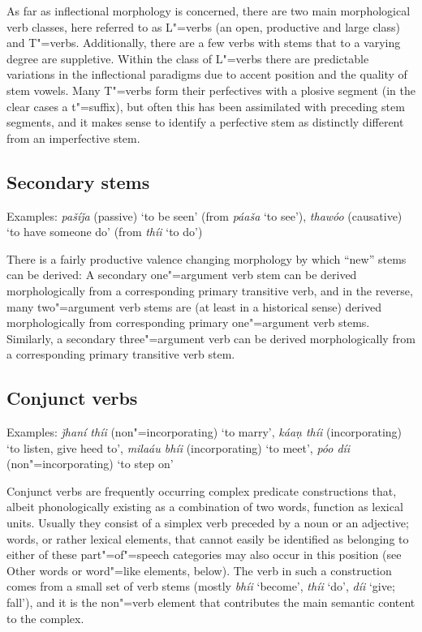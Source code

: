 As far as inflectional morphology is concerned, there are two main morphological verb classes, here referred to as L"=verbs (an open, productive and large class) and T"=verbs. Additionally, there are a few verbs with stems that to a varying degree are suppletive. Within the class of L"=verbs there are predictable variations in the inflectional paradigms due to accent position and the quality of stem vowels. Many T"=verbs form their perfectives with a plosive segment (in the clear cases a t"=suffix), but often this has been assimilated with preceding stem segments, and it makes sense to identify a perfective stem as distinctly different from an imperfective stem.


\subsection{Secondary stems}
\label{subsec:3b-3-1}
Examples: \textit{pašíǰa} (passive) `to be seen' (from \textit{páaša} `to see'), \textit{thawóo} (causative) `to have someone do' (from \textit{thíi} `to do')


There is a fairly productive valence changing morphology by which “new” stems can be derived: A secondary one"=argument verb stem can be derived morphologically from a corresponding primary transitive verb, and in the reverse, many two"=argument verb stems are (at least in a historical sense) derived morphologically from corresponding primary one"=argument verb stems. Similarly, a secondary three"=argument verb can be derived morphologically from a corresponding primary transitive verb stem. 


\subsection{Conjunct verbs}
\label{subsec:3b-3-2}
Examples: \textit{ǰhaní thíi} (non"=incorporating) `to marry', \textit{káaṇ thíi} (incorporating) `to listen, give heed to', \textit{milaáu bhíi} (incorporating) `to meet', \textit{póo díi} (non"=incorporating) `to step on'


Conjunct verbs are frequently occurring complex predicate constructions that, albeit phonologically existing as a combination of two words, function as lexical units. Usually they consist of a simplex verb preceded by a noun or an adjective; words, or rather lexical elements, that cannot easily be identified as belonging to either of these part"=of"=speech categories may also occur in this position (see Other words or word"=like elements, below). The verb in such a construction comes from a small set of verb stems (mostly \textit{bhíi} `become', \textit{thíi} `do', \textit{díi} `give; fall'), and it is the non"=verb element that contributes the main semantic content to the complex.


